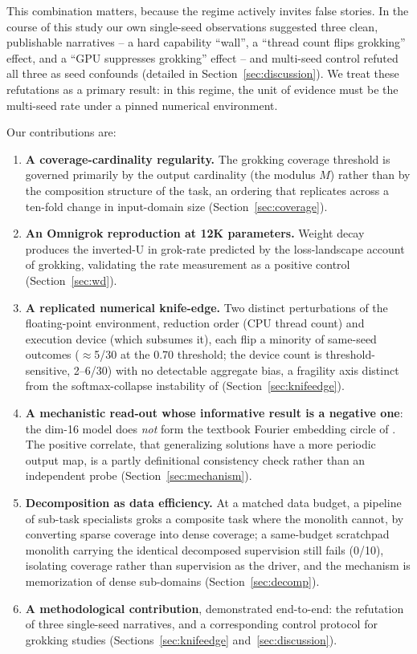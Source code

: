 \documentclass[10pt]{article} %
\begin{document}
This combination matters, because the regime actively invites false stories. In the course of
this study our own single-seed observations suggested three clean, publishable narratives -- a hard
capability ``wall'', a ``thread count flips grokking'' effect, and a ``GPU suppresses grokking''
effect -- and multi-seed control refuted all three as seed confounds
(detailed in Section~\ref{sec:discussion}). We treat these refutations as a primary result: in this regime, the unit of evidence must be the multi-seed rate
under a pinned numerical environment.

Our contributions are:
\begin{enumerate}
\item \textbf{A coverage-cardinality regularity.} The grokking coverage threshold is governed
primarily by the output cardinality (the modulus $M$) rather than by the composition structure of
the task, an ordering that replicates across a ten-fold change in input-domain size
(Section~\ref{sec:coverage}).
\item \textbf{An Omnigrok reproduction at 12K parameters.} Weight decay produces the inverted-U in
grok-rate predicted by the loss-landscape account of grokking, validating the rate measurement as
a positive control (Section~\ref{sec:wd}).
\item \textbf{A replicated numerical knife-edge.} Two distinct perturbations of the floating-point
environment, reduction order (CPU thread count) and execution device (which subsumes it), each flip
a minority of same-seed outcomes ($\approx$5/30 at the 0.70 threshold; the device count is
threshold-sensitive, 2--6/30) with no detectable aggregate bias, a fragility axis distinct from the
softmax-collapse instability of \citet{prieto2025edge} (Section~\ref{sec:knifeedge}).
\item \textbf{A mechanistic read-out whose informative result is a negative one}: the dim-16 model
does \emph{not} form the textbook Fourier embedding circle of \citet{nanda2023progress}. The
positive correlate, that generalizing solutions have a more periodic output map, is a partly
definitional consistency check rather than an independent probe (Section~\ref{sec:mechanism}).
\item \textbf{Decomposition as data efficiency.} At a matched data budget, a pipeline of sub-task
specialists groks a composite task where the monolith cannot, by converting sparse coverage into
dense coverage; a same-budget scratchpad monolith carrying the identical decomposed supervision
still fails (0/10), isolating coverage rather than supervision as the driver, and the mechanism is
memorization of dense sub-domains (Section~\ref{sec:decomp}).
\item \textbf{A methodological contribution}, demonstrated end-to-end: the refutation of three
single-seed narratives, and a corresponding control protocol for grokking studies
(Sections~\ref{sec:knifeedge} and~\ref{sec:discussion}).
\end{enumerate}
\end{document}
